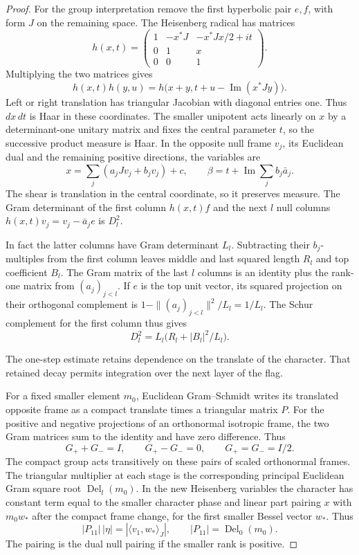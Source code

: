 \begin{proof}

For the group interpretation remove the first hyperbolic
pair \(e,f\), with form \(J\) on the remaining space.
The Heisenberg radical has matrices
\[
 h(x,t)=
 \begin{pmatrix}
 1&-x^*J&-x^*Jx/2+it\\0&1&x\\0&0&1
 \end{pmatrix}.
\]
Multiplying the two matrices gives
\[
 h(x,t)h(y,u)=h\bigl(x+y,t+u-\operatorname{Im}(x^*Jy)\bigr).
\]
Left or right translation has triangular Jacobian with
diagonal entries one. Thus \(dx\,dt\) is Haar in these
coordinates. The smaller unipotent acts linearly on \(x\)
by a determinant-one unitary matrix and fixes the central
parameter \(t\), so the successive product measure is Haar.
In the opposite null frame \(v_j\), its Euclidean dual
and the remaining positive directions, the variables are
\[
   x=\sum_j(a_jJv_j+b_jv_j)+c,\qquad
   \beta=t+\operatorname{Im}\sum_j b_j\bar a_j .
\]
The shear is translation in the central coordinate, so it
preserves measure. The Gram determinant of the first
column \(h(x,t)f\) and the next \(l\) null columns
\(h(x,t)v_j=v_j-\bar a_j e\) is \(D_l^2\).

In fact the latter columns have Gram determinant
\(L_l\). Subtracting their \(b_j\)-multiples from
the first column leaves middle and last squared
length \(R_l\) and top coefficient \(B_l\).
The Gram matrix of the last \(l\) columns is an identity
plus the rank-one matrix from \((a_j)_{j<l}\). If \(e\) is
the top unit vector, its squared projection on their orthogonal
complement is \(1-\|(a_j)_{j<l}\|^2/L_l=1/L_l\).
The Schur complement for the first column thus gives
\[
       D_l^2=L_l\bigl(R_l+|B_l|^2/L_l\bigr).
\]


The one-step estimate retains dependence on the translate of the character. That retained decay permits integration over the next layer of the flag.


For a fixed smaller element \(m_0\), Euclidean
Gram--Schmidt writes its translated opposite frame
as a compact translate times a triangular matrix
\(P\). For the positive and negative projections of an orthonormal
isotropic frame, the two Gram matrices sum to the identity and
have zero difference. Thus
\[
    G_++G_-=I,\qquad G_+-G_-=0,\qquad G_+=G_-=I/2 .
\]
The compact group acts transitively on these pairs of scaled
orthonormal frames. The triangular multiplier at each stage
is the corresponding principal Euclidean Gram
square root \(\operatorname{Del}_l(m_0)\).
In the new Heisenberg variables the character has
constant term equal to the smaller character phase
and linear part pairing \(x\) with \(m_0 w_*\) after
the compact frame change, for the first smaller
Bessel vector \(w_*\). Thus
\[
 |P_{11}|\,|\eta|=|\langle v_1,w_*\rangle_J|,
 \qquad |P_{11}|=\operatorname{Del}_0(m_0).
\]
The pairing is the dual null pairing if the smaller
rank is positive.


\end{proof}
